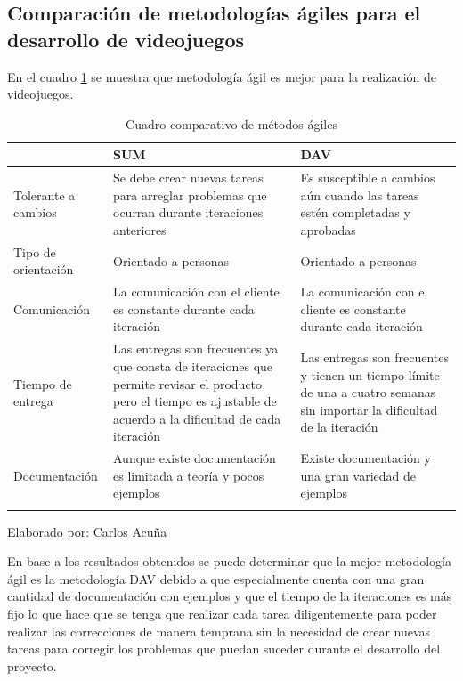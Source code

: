 \documentclass[a4paper, openright, 12pt]{report}
\begin{document}
\subsection{Comparación de metodologías ágiles para el desarrollo de videojuegos}
\justify
En el cuadro \ref{t:comparacionM} se muestra que metodología ágil es mejor para la realización de videojuegos.

\begin{longtable}{| p{3cm} | p{3cm} | p{3cm}|}
\captionsetup{justification=centering,margin=2cm}
\hline
\textbf{} & \textbf{SUM} & \textbf{DAV}\\ \hline
Tolerante a cambios 
& Se debe crear nuevas tareas para arreglar problemas que ocurran durante iteraciones anteriores 
& Es susceptible a cambios aún cuando las tareas estén completadas y aprobadas 
 \\ \hline
Tipo de orientación 
& Orientado a personas 
& Orientado a personas
 \\ \hline
Comunicación 
& La comunicación con el cliente es constante durante cada iteración  
& La comunicación con el cliente es constante durante cada iteración
 \\ \hline
Tiempo de entrega  
& Las entregas son frecuentes ya que consta de iteraciones que permite revisar el producto pero el tiempo es ajustable de acuerdo a la dificultad de cada iteración  
& Las entregas son frecuentes y tienen un tiempo límite de una a cuatro semanas sin importar la dificultad de la iteración
 \\ \hline
Documentación 
& Aunque existe documentación es limitada a teoría y pocos ejemplos
& Existe documentación y una gran variedad de ejemplos\\ \hline
\caption{Cuadro comparativo de métodos ágiles}
\label{t:comparacionM}
\end{longtable}

\begin{center}
Elaborado por: Carlos Acuña
\end{center}

\justify
En base a los resultados obtenidos se puede determinar que la mejor metodología ágil es la metodología DAV debido a que especialmente cuenta con una gran cantidad de documentación con ejemplos y que el tiempo de la iteraciones es más fijo lo que hace que se tenga que realizar cada tarea diligentemente para poder realizar las correcciones de manera temprana sin la necesidad de crear nuevas tareas para corregir los problemas que puedan suceder durante el desarrollo del proyecto.
\end{document}
